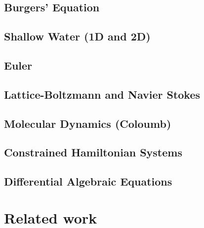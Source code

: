 \documentclass[12pt]{article}
\begin{document}
\subsection{Burgers' Equation}


\subsection{Shallow Water (1D and 2D)}


\subsection{Euler}


\subsection{Lattice-Boltzmann and Navier Stokes}



%
%

\subsection{Molecular Dynamics (Coloumb)}



%
%

\subsection{Constrained Hamiltonian Systems}

\subsection{Differential Algebraic Equations}




\section*{Related work}

\end{document}
